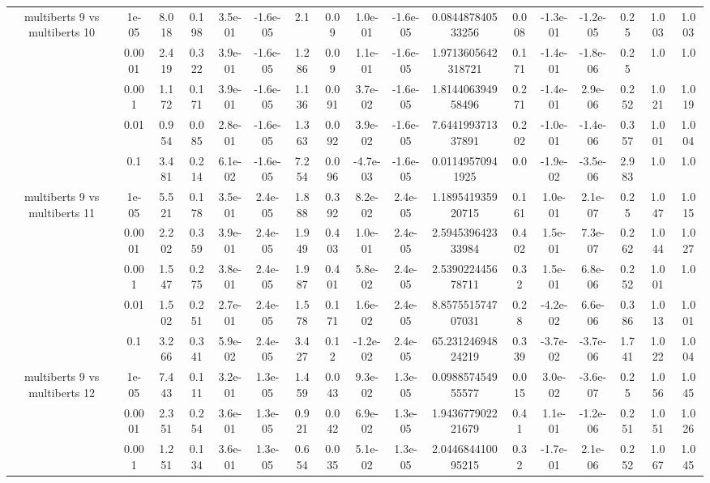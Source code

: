 \begin{tabular}{|c|c|c|c|c|c|c|c|c|c|c|c|c|c|c|c|c|}
\hline
\multirow{5}{*}{multiberts 9 vs multiberts 10} & 1e-05 & 8.018 & 0.198 & 3.5e-01 & -1.6e-05 & 2.1 & 0.09 & 1.0e-01 & -1.6e-05 & 0.084487840533256 & 0.008 & -1.3e-01 & -1.2e-05 & 0.25 & 1.003 & 1.003 \\
 & 0.0001 & 2.419 & 0.322 & 3.9e-01 & -1.6e-05 & 1.286 & 0.09 & 1.1e-01 & -1.6e-05 & 1.9713605642318721 & 0.171 & -1.4e-01 & -1.8e-06 & 0.25 & 1.0 & 1.0 \\
 & 0.001 & 1.172 & 0.171 & 3.9e-01 & -1.6e-05 & 1.136 & 0.091 & 3.7e-02 & -1.6e-05 & 1.814406394958496 & 0.271 & -1.4e-01 & 2.9e-06 & 0.252 & 1.021 & 1.019 \\
 & 0.01 & 0.954 & 0.085 & 2.8e-01 & -1.6e-05 & 1.363 & 0.092 & 3.9e-02 & -1.6e-05 & 7.644199371337891 & 0.202 & -1.0e-01 & -1.4e-06 & 0.357 & 1.001 & 1.004 \\
 & 0.1 & 3.481 & 0.214 & 6.1e-02 & -1.6e-05 & 7.254 & 0.096 & -4.7e-03 & -1.6e-05 & 0.01149570941925 & 0.0 & -1.9e-02 & -3.5e-06 & 2.983 & 1.0 & 1.0 \\
\hline
\multirow{5}{*}{multiberts 9 vs multiberts 11} & 1e-05 & 5.521 & 0.178 & 3.5e-01 & 2.4e-05 & 1.888 & 0.392 & 8.2e-02 & 2.4e-05 & 1.189541935920715 & 0.161 & 1.0e-01 & 2.1e-07 & 0.25 & 1.047 & 1.015 \\
 & 0.0001 & 2.202 & 0.359 & 3.9e-01 & 2.4e-05 & 1.949 & 0.403 & 1.0e-01 & 2.4e-05 & 2.594539642333984 & 0.402 & 1.5e-01 & 7.3e-07 & 0.262 & 1.044 & 1.027 \\
 & 0.001 & 1.547 & 0.275 & 3.8e-01 & 2.4e-05 & 1.987 & 0.401 & 5.8e-02 & 2.4e-05 & 2.539022445678711 & 0.32 & 1.5e-01 & 6.8e-06 & 0.252 & 1.001 & 1.0 \\
 & 0.01 & 1.502 & 0.251 & 2.7e-01 & 2.4e-05 & 1.578 & 0.171 & 1.6e-02 & 2.4e-05 & 8.857551574707031 & 0.28 & -4.2e-02 & 6.6e-06 & 0.386 & 1.013 & 1.001 \\
 & 0.1 & 3.266 & 0.341 & 5.9e-02 & 2.4e-05 & 3.427 & 0.12 & -1.2e-02 & 2.4e-05 & 65.23124694824219 & 0.339 & -3.7e-02 & -3.7e-06 & 1.741 & 1.022 & 1.004 \\
\hline
\multirow{5}{*}{multiberts 9 vs multiberts 12} & 1e-05 & 7.443 & 0.111 & 3.2e-01 & 1.3e-05 & 1.459 & 0.043 & 9.3e-02 & 1.3e-05 & 0.098857454955577 & 0.015 & 3.0e-02 & -3.6e-07 & 0.25 & 1.056 & 1.045 \\
 & 0.0001 & 2.351 & 0.254 & 3.6e-01 & 1.3e-05 & 0.921 & 0.042 & 6.9e-02 & 1.3e-05 & 1.943677902221679 & 0.41 & 1.1e-01 & -1.2e-06 & 0.251 & 1.051 & 1.026 \\
 & 0.001 & 1.251 & 0.134 & 3.6e-01 & 1.3e-05 & 0.654 & 0.035 & 5.1e-02 & 1.3e-05 & 2.044684410095215 & 0.32 & -1.7e-01 & 2.1e-06 & 0.252 & 1.067 & 1.045 \\

\end{tabular}
